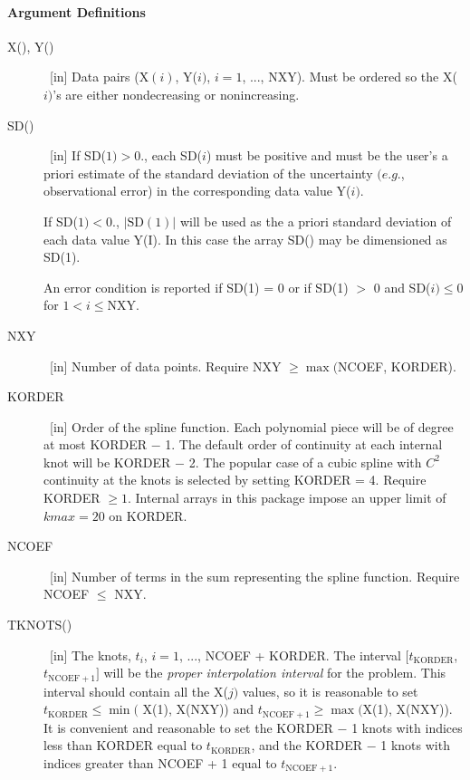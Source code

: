 \documentclass[twoside]{MATH77}
\begin{document}
\paragraph{Argument Definitions}
\begin{description}
\item[X(), Y()]  \ [in] Data pairs (X$(i)$, Y($i)$, $i=1$, ..., NXY). Must
be ordered so the X($i)$'s are either nondecreasing or
nonincreasing.

\item[SD()]  \ [in] If SD($1)>0.$, each SD($i$) must be positive and must be
the user's a priori estimate of the standard deviation of the uncertainty $%
(e.g.$, observational error) in the corresponding data value Y($i).$

If SD($1)<0.$, $|\text{SD}(1)|$ will be used as the a priori standard
deviation of each data value Y(I). In this case the array SD() may be
dimensioned as SD(1).

An error condition is reported if SD(1) = 0 or if SD(1) $>$ 0 and
SD($i) \leq 0$ for $1 < i \leq \text{NXY}.$

\item[NXY]  \ [in] Number of data points. Require NXY $\geq \max ($NCOEF,
KORDER).

\item[KORDER]  \ [in] Order of the spline function. Each polynomial piece
will be of degree at most KORDER $-$ 1. The default order of continuity at
each internal knot will be KORDER $-$ 2. The popular case of a cubic spline
with $C^2$ continuity at the knots is selected by setting KORDER = 4.
Require KORDER $\geq 1$. Internal arrays in this package impose an upper
limit of $kmax=20$ on KORDER.

\item[NCOEF]  \ [in] Number of terms in the sum representing the spline
function. Require NCOEF $\leq $ NXY.

\item[TKNOTS()]  \ [in] The knots, $t_i$, $i=1$, ..., NCOEF + KORDER. The
interval $[t_{\text{KORDER}}$, $t_{\text{NCOEF}+1}]$ will be the {\em proper
interpolation interval} for the problem. This interval should contain all the
X($j)$ values, so it is reasonable to set $t_{\text{KORDER}}\leq \min ($%
X(1), X(NXY)) and $t_{\text{NCOEF}+1}\geq \max ($X(1), X(NXY)). It is
convenient and reasonable to set the KORDER $-$ 1 knots with indices less
than KORDER equal to $t_{\text{KORDER}}$, and the KORDER $-$ 1 knots with
indices greater than NCOEF + 1 equal to $t_{\text{NCOEF}+1}.$


\end{description}
\end{document}
